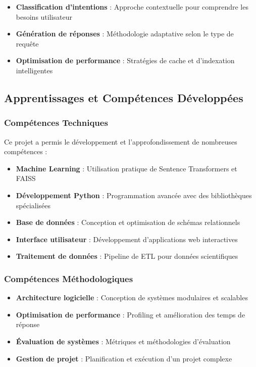 \documentclass[12pt,a4paper]{article}
\begin{document}
\begin{itemize}
    \item \textbf{Classification d'intentions} : Approche contextuelle pour comprendre les besoins utilisateur
    \item \textbf{Génération de réponses} : Méthodologie adaptative selon le type de requête
    \item \textbf{Optimisation de performance} : Stratégies de cache et d'indexation intelligentes
\end{itemize}

\subsection{Apprentissages et Compétences Développées}

\subsubsection{Compétences Techniques}

Ce projet a permis le développement et l'approfondissement de nombreuses compétences :

\begin{itemize}
    \item \textbf{Machine Learning} : Utilisation pratique de Sentence Transformers et FAISS
    \item \textbf{Développement Python} : Programmation avancée avec des bibliothèques spécialisées
    \item \textbf{Base de données} : Conception et optimisation de schémas relationnels
    \item \textbf{Interface utilisateur} : Développement d'applications web interactives
    \item \textbf{Traitement de données} : Pipeline de ETL pour données scientifiques
\end{itemize}

\subsubsection{Compétences Méthodologiques}

\begin{itemize}
    \item \textbf{Architecture logicielle} : Conception de systèmes modulaires et scalables
    \item \textbf{Optimisation de performance} : Profiling et amélioration des temps de réponse
    \item \textbf{Évaluation de systèmes} : Métriques et méthodologies d'évaluation
    \item \textbf{Gestion de projet} : Planification et exécution d'un projet complexe
\end{itemize}
\end{document}
